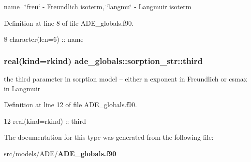 name=\char`\"{}freu\char`\"{} -\/ Freundlich isoterm, \char`\"{}langmu\char`\"{} -\/ Langmuir isoterm 



Definition at line 8 of file A\+D\+E\+\_\+globals.\+f90.


\begin{DoxyCode}
8     \textcolor{keywordtype}{character(len=6)} :: name
\end{DoxyCode}
\subsubsection[{third}]{\setlength{\rightskip}{0pt plus 5cm}real(kind=rkind) ade\+\_\+globals\+::sorption\+\_\+str\+::third}\label{structade__globals_1_1sorption__str_a0f1ac70c06fdd32ca0c6d47eaaa8717d}


the third parameter in sorption model -- either n exponent in Freundlich or csmax in Langmuir 



Definition at line 12 of file A\+D\+E\+\_\+globals.\+f90.


\begin{DoxyCode}
12     \textcolor{keywordtype}{real(kind=rkind)} :: third
\end{DoxyCode}


The documentation for this type was generated from the following file\+:\begin{DoxyCompactItemize}
\item 
src/models/\+A\+D\+E/{\bf A\+D\+E\+\_\+globals.\+f90}\end{DoxyCompactItemize}
